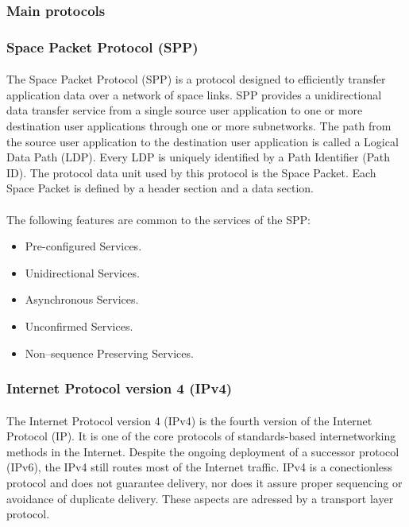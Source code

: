\subsubsection{Main protocols}

\subsubsection*{Space Packet Protocol (SPP)\cite{SPP}}
\paragraph{}The Space Packet Protocol (SPP) is a protocol designed to efficiently transfer application data over a network of space links. SPP provides a unidirectional data transfer service from a single source user application to one or more destination user applications through one or more subnetworks. The path from the source user application to the destination user application is called a Logical Data Path (LDP). Every LDP is uniquely identified by a Path Identifier (Path ID). The protocol data unit used by this protocol is the Space Packet. Each Space Packet is defined by a header section and a data section.
\paragraph{}The following features are common to the services of the SPP:
\begin{itemize}
\item Pre-configured Services. 
\item Unidirectional Services.
\item Asynchronous Services.
\item Unconfirmed Services. 
\item Non–sequence Preserving Services.
\end{itemize}
\subsubsection{Internet Protocol version 4 (IPv4)\cite{IP}}
\paragraph{}The Internet Protocol version 4 (IPv4) is the fourth version of the Internet Protocol (IP). It is one of the core protocols of standards-based internetworking methods in the Internet. Despite the ongoing deployment of a successor protocol (IPv6), the IPv4 still routes most of the Internet traffic. IPv4 is a conectionless protocol and does not guarantee delivery, nor does it assure proper sequencing or avoidance of duplicate delivery. These aspects are adressed by a transport layer protocol.
